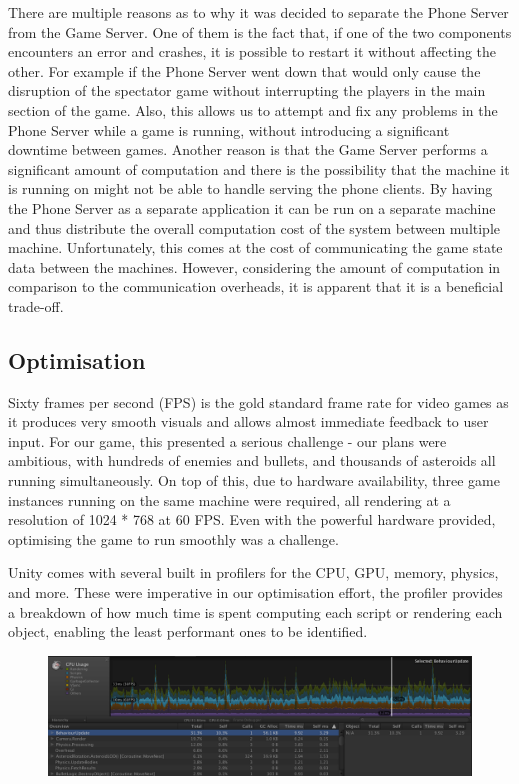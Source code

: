 \documentclass[a4paper,11pt]{article}
\begin{document}
There are multiple reasons as to why it was decided to separate the Phone Server from the Game Server. One of them is the fact that, if one of the two components encounters an error and crashes, it is possible to restart it without affecting the other. For example if the Phone Server went down that would only cause the disruption of the spectator game without interrupting the players in the main section of the game. Also, this allows us to attempt and fix any problems in the Phone Server while a game is running, without introducing a significant downtime between games. Another reason is that the Game Server performs a significant amount of computation and there is the possibility that the machine it is running on might not be able to handle serving the phone clients. By having the Phone Server as a separate application it can be run on a separate machine and thus distribute the overall computation cost of the system between multiple machine. Unfortunately, this comes at the cost of communicating the game state data between the machines. However, considering the amount of computation in comparison to the communication overheads, it is apparent that it is a beneficial trade-off.

\subsection{Optimisation}
Sixty frames per second (FPS) is the gold standard frame rate for video games as it produces very smooth visuals and allows almost immediate feedback to user input. For our game, this presented a serious challenge - our plans were ambitious, with hundreds of enemies and bullets, and thousands of asteroids all running simultaneously. On top of this, due to hardware availability, three game instances running on the same machine were required, all rendering at a resolution of 1024 * 768 at 60 FPS. Even with the powerful hardware provided, optimising the game to run smoothly was a challenge.

Unity comes with several built in profilers for the CPU, GPU, memory, physics, and more. These were imperative in our optimisation effort, the profiler provides a breakdown of how much time is spent computing each script or rendering each object, enabling the least performant ones to be identified.

\begin{figure}[ht]
	\centering
	\includegraphics[width=\textwidth]{images/profiler}
    \label{fig:profiler}
\end{figure}
\end{document}
